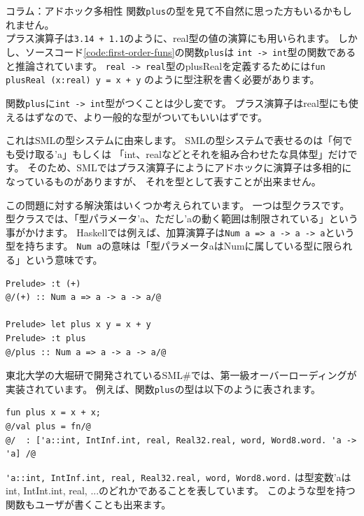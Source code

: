 \documentclass[11pt,a4paper]{article}
\begin{document}
\begin{itembox}[l]{コラム：アドホック多相性}
関数\lstinline{plus}の型を見て不自然に思った方もいるかもしれません。\\
プラス演算子は\lstinline{3.14 + 1.1}のように、real型の値の演算にも用いられます。
しかし、ソースコード\ref{code:first-order-funs}の関数\lstinline{plus}は
\lstinline{int -> int}型の関数であると推論されています。
\lstinline{real -> real}型のplusRealを定義するためには\lstinline{fun plusReal (x:real) y = x + y}
のように型注釈を書く必要があります。

関数\lstinline{plus}に\lstinline{int -> int}型がつくことは少し変です。
プラス演算子はreal型にも使えるはずなので、より一般的な型がついてもいいはずです。

これはSMLの型システムに由来します。
SMLの型システムで表せるのは「何でも受け取る'a」もしくは
「int、realなどとそれを組み合わせたな具体型」だけです。
そのため、SMLではプラス演算子にようにアドホックに演算子は多相的になっているものがありますが、
それを型として表すことが出来ません。

この問題に対する解決策はいくつか考えられています。
一つは型クラスです。型クラスでは、「型パラメータ'a、ただし'aの動く範囲は制限されている」という事がかけます。
Haskellでは例えば、加算演算子は\lstinline{Num a => a -> a -> a}という型を持ちます。
\lstinline{Num a}の意味は「型パラメータaはNumに属している型に限られる」という意味です。

\begin{lstlisting}[caption=Haskellでのplusの型付け]
Prelude> :t (+)
@/(+) :: Num a => a -> a -> a/@

Prelude> let plus x y = x + y
Prelude> :t plus
@/plus :: Num a => a -> a -> a/@
\end{lstlisting}

東北大学の大堀研で開発されているSML\#\cite{smlsharp}では、第一級オーバーローディングが実装されています。
例えば、関数\lstinline{plus}の型は以下のように表されます。
\begin{lstlisting}[caption=SML\#でのplusの型付け]
fun plus x = x + x;
@/val plus = fn/@
@/  : ['a::int, IntInf.int, real, Real32.real, word, Word8.word. 'a -> 'a] /@
\end{lstlisting}
\lstinline{'a::int, IntInf.int, real, Real32.real, word, Word8.word.}
は型変数'aはint, IntInt.int, real, ...のどれかであることを表しています。
このような型を持つ関数もユーザが書くことも出来ます。

\end{itembox}

\label{sec:list}
\end{document}
